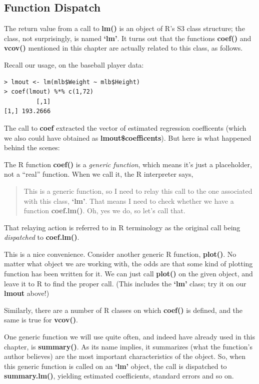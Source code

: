 \subsection{Function Dispatch}
\label{dispatch}

The return value from a call to {\bf lm()} is an object of R's S3 class
structure; the class, not surprisingly, is named {\bf `lm'}.  It turns
out that the functions {\bf coef()} and {\bf vcov()} mentioned in this
chapter are actually related to this class, as follows.

Recall our usage, on the baseball player data:

\begin{lstlisting}
> lmout <- lm(mlb$Weight ~ mlb$Height)
> coef(lmout) %*% c(1,72)
         [,1]
[1,] 193.2666
\end{lstlisting}

The call to {\bf coef} extracted the vector of estimated regression
coefficents (which we also could have obtained as {\bf
lmout\$coefficents}).  But here is what happened behind the scenes:

The R function {\bf coef()} is a {\it generic function}, which means
it's just a placeholder, not a ``real'' function.  When we call it, the
R interpreter says, 

\begin{quote}

This is a generic function, so I need to relay this call to the one
associated with this class, {\bf `lm'}.  That means I need to check
whether we have a function {\bf coef.lm()}.  Oh, yes we do, so let's
call that.

\end{quote}

That relaying action is referred to in R terminology as the original
call being {\it dispatched} to {\bf coef.lm()}.

This is a nice convenience.  Consider another generic R function, {\bf
plot()}.  No matter what object we are working with, the odds are that
some kind of plotting function has been written for it.  We can just
call {\bf plot()} on the given object, and leave it to R to find the
proper call.  (This includes the {\bf `lm'} class; try it on our {\bf
lmout} above!)

Similarly, there are a number of R classes on which {\bf coef()} is
defined, and the same is true for {\bf vcov()}.

One generic function we will use quite often, and indeed have already
used in this chapter, is {\bf summary()}.  As its name implies, it
summarizes (what the function's author believes) are the most important
characteristics of the object.  So, when this generic function is called
on an {\bf `lm'} object, the call is dispatched to {\bf summary.lm()},
yielding estimated coefficients, standard errors and so on.

